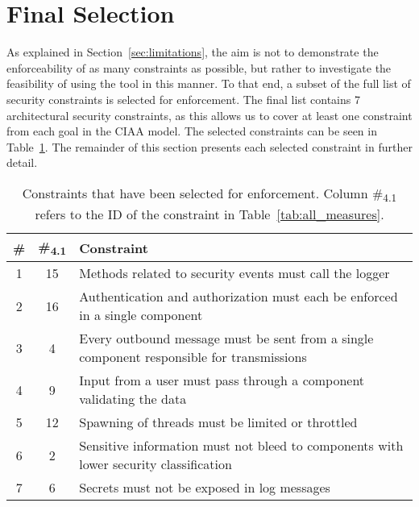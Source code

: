 \section{Final Selection}

As explained in Section~\ref{sec:limitations}, the aim is not to demonstrate the enforceability of as many constraints as possible, but rather to investigate the feasibility of using the tool in this manner. To that end, a subset of the full list of security constraints is selected for enforcement. The final list contains 7 architectural security constraints, as this allows us to cover at least one constraint from each goal in the CIAA model. The selected constraints can be seen in Table~\ref{tab:selected_measures}. The remainder of this section presents each selected constraint in further detail.

\begin{table}
\begin{center}
\begin{tabular}{ccp{12.4cm}}
\hline
\textbf{\#} & \textbf{\#\textsubscript{4.1}} & \textbf{Constraint} \\
\hline
1 & 15 & Methods related to security events must call the logger\\
\rowcolor{RowColor}
2 & 16 & Authentication and authorization must each be enforced in a single component\\
3 & 4 & Every outbound message must be sent from a single component responsible for transmissions\\
\rowcolor{RowColor}
4 & 9 & Input from a user must pass through a component validating the data\\
5 & 12 & Spawning of threads must be limited or throttled\\
\rowcolor{RowColor}
6 & 2 & Sensitive information must not bleed to components with lower security classification\\
7 & 6 & Secrets must not be exposed in log messages\\
\hline
\end{tabular}
\end{center}
\caption{Constraints that have been selected for enforcement. Column \#\textsubscript{4.1} refers to the ID of the constraint in Table~\ref{tab:all_measures}.}
\label{tab:selected_measures}
\end{table}


